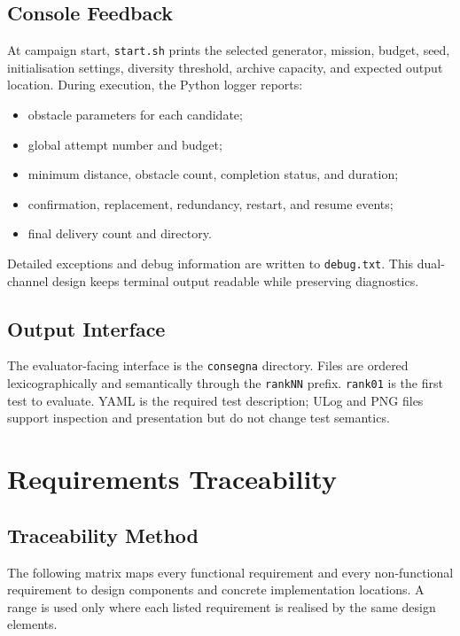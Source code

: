 \documentclass[11pt,a4paper,openany]{report}
\newcommand{\code}[1]{\texttt{#1}}
\begin{document}
\section{Console Feedback}
At campaign start, \code{start.sh} prints the selected generator, mission, budget, seed, initialisation settings, diversity threshold, archive capacity, and expected output location. During execution, the Python logger reports:
\begin{itemize}
  \item obstacle parameters for each candidate;
  \item global attempt number and budget;
  \item minimum distance, obstacle count, completion status, and duration;
  \item confirmation, replacement, redundancy, restart, and resume events;
  \item final delivery count and directory.
\end{itemize}

Detailed exceptions and debug information are written to \code{debug.txt}. This dual-channel design keeps terminal output readable while preserving diagnostics.

\section{Output Interface}
The evaluator-facing interface is the \code{consegna} directory. Files are ordered lexicographically and semantically through the \code{rankNN} prefix. \code{rank01} is the first test to evaluate. YAML is the required test description; ULog and PNG files support inspection and presentation but do not change test semantics.

\chapter{Requirements Traceability}

\section{Traceability Method}
The following matrix maps every functional requirement and every non-functional requirement to design components and concrete implementation locations. A range is used only where each listed requirement is realised by the same design elements.
\end{document}
